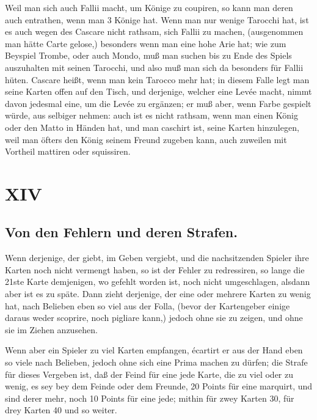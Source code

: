 \documentclass[11pt,a6paper,twoside]{article}
\begin{document}
Weil man sich auch Fallii macht, um Könige zu coupiren, so kann man deren auch entrathen, wenn man 3 Könige hat. Wenn man nur wenige Tarocchi hat, ist es auch wegen des Cascare nicht rathsam, sich Fallii zu machen, (ausgenommen man hätte Carte gelose,) besonders wenn man eine hohe Arie hat; wie zum Beyspiel Trombe, oder auch Mondo, muß man suchen bis zu Ende des Spiels auszuhalten mit seinen Tarocchi, und also muß man sich da besonders für Fallii hüten. Cascare heißt, wenn man kein Tarocco mehr hat; in diesem Falle legt man seine Karten offen auf den Tisch, und derjenige, welcher eine Levée macht, nimmt davon jedesmal eine, um die Levée zu ergänzen; er muß aber, wenn Farbe gespielt würde, aus selbiger nehmen: auch ist es nicht rathsam, wenn man einen König oder den Matto in Händen hat, und man caschirt ist, seine Karten hinzulegen, weil man öfters den König seinem Freund zugeben kann, auch zuweilen mit Vortheil mattiren oder squissiren.

\section{XIV}
\subsection{Von den Fehlern und deren Strafen.}

Wenn derjenige, der giebt, im Geben vergiebt, und die nachsitzenden Spieler ihre Karten noch nicht vermengt haben, so ist der Fehler zu redressiren, so lange die 21ste Karte demjenigen, wo gefehlt worden ist, noch nicht umgeschlagen, alsdann aber ist es zu späte. Dann zieht derjenige, der eine oder mehrere Karten zu wenig hat, nach Belieben eben so viel aus der Folla, (bevor der Kartengeber einige daraus weder scoprire, noch pigliare kann,) jedoch ohne sie zu zeigen, und ohne sie im Ziehen anzusehen.

Wenn aber ein Spieler zu viel Karten empfangen, écartirt er aus der Hand eben so viele nach Belieben, jedoch ohne sich eine Prima machen zu dürfen; die Strafe für dieses Vergeben ist, daß der Feind für eine jede Karte, die zu viel oder zu wenig, es sey bey dem Feinde oder dem Freunde, 20 Points für eine marquirt, und sind derer mehr, noch 10 Points für eine jede; mithin für zwey Karten 30, für drey Karten 40 und so weiter.
\end{document}
